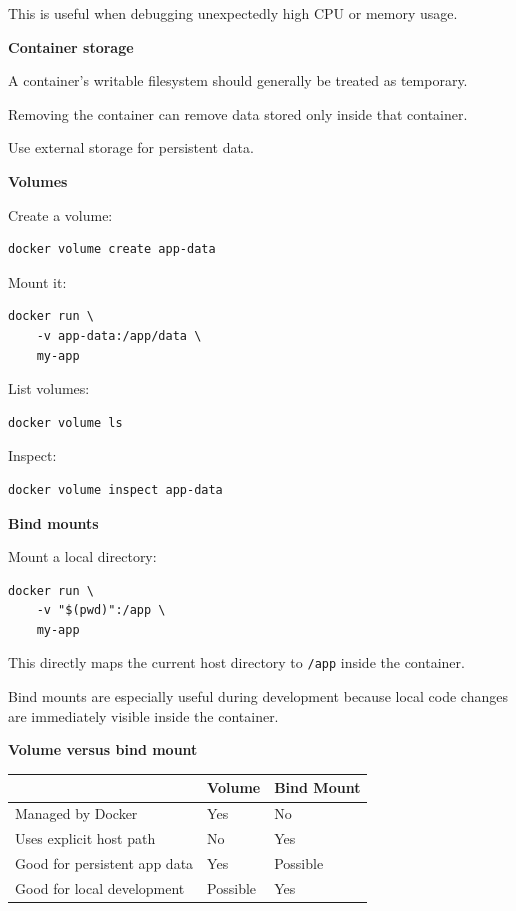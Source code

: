 \documentclass[11pt,letterpaper]{article}
\begin{document}
This is useful when debugging unexpectedly high CPU or memory usage.



\textbf{Container storage}

A container's writable filesystem should generally be treated as temporary.

Removing the container can remove data stored only inside that container.

Use external storage for persistent data.

\textbf{Volumes}

Create a volume:

\begin{lstlisting}
docker volume create app-data
\end{lstlisting}

Mount it:

\begin{lstlisting}
docker run \
    -v app-data:/app/data \
    my-app
\end{lstlisting}

List volumes:

\begin{lstlisting}
docker volume ls
\end{lstlisting}

Inspect:

\begin{lstlisting}
docker volume inspect app-data
\end{lstlisting}

\textbf{Bind mounts}

Mount a local directory:

\begin{lstlisting}
docker run \
    -v "$(pwd)":/app \
    my-app
\end{lstlisting}

This directly maps the current host directory to \texttt{/app} inside the
container.

Bind mounts are especially useful during development because local code
changes are immediately visible inside the container.

\textbf{Volume versus bind mount}

\begin{center}
\begin{tabularx}{\textwidth}{lXX}
\toprule
 & Volume & Bind Mount \\
\midrule
Managed by Docker & Yes & No \\
Uses explicit host path & No & Yes \\
Good for persistent app data & Yes & Possible \\
Good for local development & Possible & Yes \\
\bottomrule
\end{tabularx}
\end{center}
\end{document}
